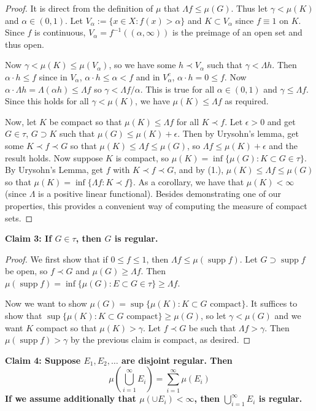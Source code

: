\documentclass[12pt, a4paper]{book}
\DeclareMathOperator{\supp}{supp}
\theoremstyle{nonumberplain}
\newtheorem{proof}{Proof}
\begin{document}
\begin{proof}
    It is direct from the definition of $\mu$ that $\Lambda f\leq\mu(G)$.
    Thus let $\gamma<\mu(K)$ and $\alpha\in(0,1)$.
    Let $V_\alpha:=\{x\in X:f(x)>\alpha\}$ and $K\subset V_\alpha$ since $f\equiv 1$ on $K$.
    Since $f$ is continuous, $V_\alpha=f^{-1}((\alpha,\infty))$ is the preimage of an open set and thus open.

    Now $\gamma<\mu(K)\leq\mu(V_\alpha)$, so we have some $h\prec V_\alpha$ such that $\gamma<\Lambda h$.
    Then $\alpha\cdot h\leq f$ since in $V_\alpha$, $\alpha\cdot h\leq\alpha<f$ and in $V_\alpha^c$, $\alpha\cdot h=0\leq f$.
    Now $\alpha\cdot\Lambda h=\Lambda(\alpha h)\leq\Lambda f$ so $\gamma<\Lambda f/\alpha$.
    This is true for all $\alpha\in(0,1)$ and $\gamma\leq\Lambda f$.
    Since this holds for all $\gamma<\mu(K)$, we have $\mu(K)\leq\Lambda f$ as required.

    Now, let $K$ be compact so that $\mu(K)\leq\Lambda f$ for all $K\prec f$.
    Let $\epsilon>0$ and get $G\in\tau$, $G\supset K$ such that $\mu(G)\leq\mu(K)+\epsilon$.
    Then by Urysohn's lemma, get some $K\prec f\prec G$ so that $\mu(K)\leq\Lambda f\leq\mu(G)$, so $\Lambda f\leq\mu(K)+\epsilon$ and the result holds.
    Now suppose $K$ is compact, so $\mu(K)=\inf\{\mu(G):K\subset G\in\tau\}$.
    By Urysohn's Lemma, get $f$ with $K\prec f\prec G$, and by (1.), $\mu(K)\leq\Lambda f\leq\mu(G)$ so that $\mu(K)=\inf\{\Lambda f:K\prec f\}$.
    As a corollary, we have that $\mu(K)<\infty$ (since $\Lambda$ is a positive linear functional).
    Besides demonstrating one of our properties, this provides a convenient way of computing the measure of compact sets.
\end{proof}
\textbf{Claim 3: If $G\in\tau$, then $G$ is regular.}
\begin{proof}
    We first show that if $0\leq f\leq 1$, then $\Lambda f\leq\mu(\supp f)$.
    Let $G\supset\supp f$ be open, so $f\prec G$ and $\mu(G)\geq\Lambda f$.
    Then $\mu(\supp f)=\inf\{\mu(G):E\subset G\in\tau\}\geq\Lambda f$.

    Now we want to show $\mu(G)=\sup\{\mu(K):K\subset G\text{ compact}\}$.
    It suffices to show that $\sup\{\mu(K):K\subset G\text{ compact}\}\geq\mu(G)$, so let $\gamma<\mu(G)$ and we want $K$ compact so that $\mu(K)>\gamma$.
    Let $f\prec G$ be such that $\Lambda f>\gamma$.
    Then $\mu(\supp f)>\gamma$ by the previous claim is compact, as desired.
\end{proof}
\textbf{Claim 4: Suppose $E_1,E_2,\ldots$ are disjoint regular.
Then
\begin{equation*}\mu\left(\bigcup\limits_{i=1}^\infty E_i\right)=\sum\limits_{i=1}^\infty \mu(E_i)\end{equation*}
If we assume additionally that $\mu(\cup E_i)<\infty$, then $\bigcup_{i=1}^\infty E_i$ is regular.
}
\end{document}
